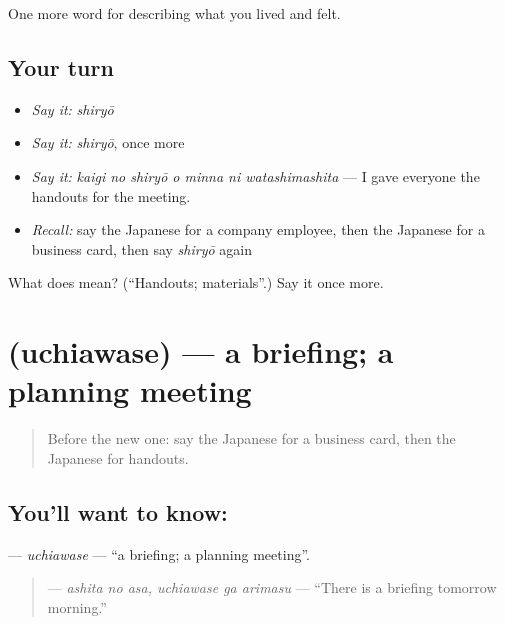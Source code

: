 \begin{grammarlens}[title={What you've built}]
One more word for describing what you lived and felt.
\end{grammarlens}

\subsection*{Your turn}
\begin{itemize}
\raggedright
  \item \emph{Say it:} \emph{shiryō}
  \item \emph{Say it:} \emph{shiryō}, once more
  \item \emph{Say it:} \emph{kaigi no shiryō o minna ni watashimashita} — I gave everyone the handouts for the meeting.
  \item \emph{Recall:} say the Japanese for a company employee, then the Japanese for a business card, then say \emph{shiryō} again
\end{itemize}

\begin{tcolorbox}[breakable,colback=teal!4,colframe=teal!35!black,title={Before you move on}]
What does  mean? (\textquotedblleft{}Handouts; materials\textquotedblright{}.) Say it once more.
\end{tcolorbox}
\section[\texorpdfstring{\ja{うちあわせ} (uchiawase)}{うちあわせ (uchiawase)}]{ (uchiawase) — a briefing; a planning meeting}

\label{lesson:JA-C453-uchiawase}



\begin{quote}
Before the new one: say the Japanese for a business card, then the Japanese for handouts.
\end{quote}

\subsection*{You'll want to know: }
\textbf{} — \emph{uchiawase} — \textquotedblleft{}a briefing; a planning meeting\textquotedblright{}.

\begin{quote}
\textbf{  } — \emph{ashita no asa, uchiawase ga arimasu} — \textquotedblleft{}There is a briefing tomorrow morning.\textquotedblright{}
\end{quote}

